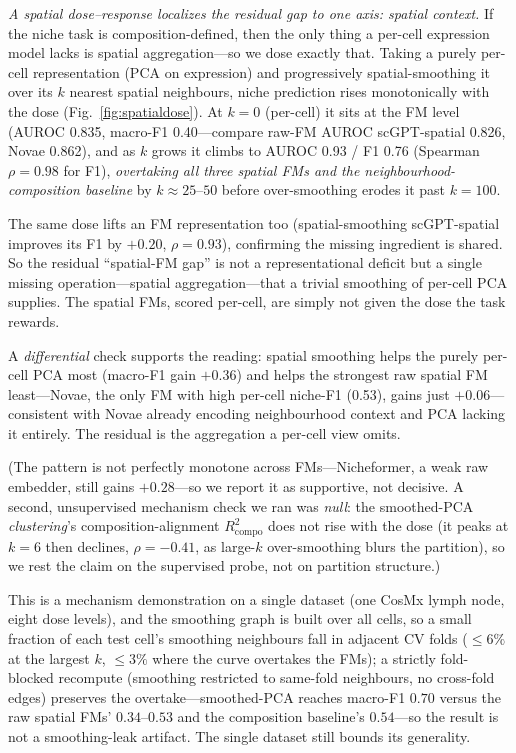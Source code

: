 \documentclass[11pt]{article}
\begin{document}
\emph{A spatial dose--response localizes the residual gap to one axis: spatial context.} If the niche task is composition-defined, then the only thing a per-cell expression model lacks is spatial aggregation---so we dose exactly that. Taking a purely per-cell representation (PCA on expression) and progressively spatial-smoothing it over its $k$ nearest spatial neighbours, niche prediction rises monotonically with the dose (Fig.~\ref{fig:spatialdose}). At $k{=}0$ (per-cell) it sits at the FM level (AUROC 0.835, macro-F1 0.40---compare raw-FM AUROC scGPT-spatial 0.826, Novae 0.862), and as $k$ grows it climbs to AUROC 0.93 / F1 0.76 (Spearman $\rho=0.98$ for F1), \emph{overtaking all three spatial FMs and the neighbourhood-composition baseline} by $k\approx25$--$50$ before over-smoothing erodes it past $k{=}100$.

The same dose lifts an FM representation too (spatial-smoothing scGPT-spatial improves its F1 by $+0.20$, $\rho=0.93$), confirming the missing ingredient is shared. So the residual ``spatial-FM gap'' is not a representational deficit but a single missing operation---spatial aggregation---that a trivial smoothing of per-cell PCA supplies. The spatial FMs, scored per-cell, are simply not given the dose the task rewards.

A \emph{differential} check supports the reading: spatial smoothing helps the purely per-cell PCA most (macro-F1 gain $+0.36$) and helps the strongest raw spatial FM least---Novae, the only FM with high per-cell niche-F1 (0.53), gains just $+0.06$---consistent with Novae already encoding neighbourhood context and PCA lacking it entirely. The residual is the aggregation a per-cell view omits.

(The pattern is not perfectly monotone across FMs---Nicheformer, a weak raw embedder, still gains $+0.28$---so we report it as supportive, not decisive. A second, unsupervised mechanism check we ran was \emph{null}: the smoothed-PCA \emph{clustering}'s composition-alignment $R^2_{\mathrm{compo}}$ does not rise with the dose (it peaks at $k{=}6$ then declines, $\rho=-0.41$, as large-$k$ over-smoothing blurs the partition), so we rest the claim on the supervised probe, not on partition structure.)

This is a mechanism demonstration on a single dataset (one CosMx lymph node, eight dose levels), and the smoothing graph is built over all cells, so a small fraction of each test cell's smoothing neighbours fall in adjacent CV folds ($\le 6\%$ at the largest $k$, $\le 3\%$ where the curve overtakes the FMs); a strictly fold-blocked recompute (smoothing restricted to same-fold neighbours, no cross-fold edges) preserves the overtake---smoothed-PCA reaches macro-F1 $0.70$ versus the raw spatial FMs' $0.34$--$0.53$ and the composition baseline's $0.54$---so the result is not a smoothing-leak artifact. The single dataset still bounds its generality.
\end{document}
